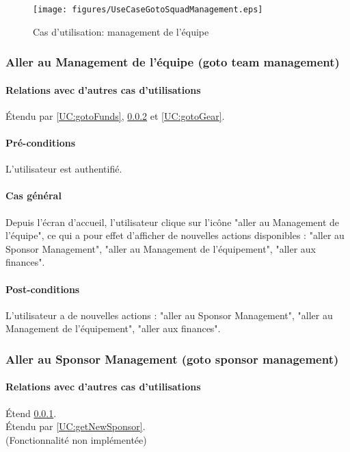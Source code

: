 \begin{figure}[h]
  \centering
  \texttt{[image: figures/UseCaseGotoSquadManagement.eps]}
   \caption{\label{fig:UC:gotoManagement} Cas d'utilisation: management de l'équipe}
\end{figure}

\subsubsection{Aller au Management de l'équipe (goto team management)}
\label{UC:gotoManagement}
\paragraph{Relations avec d'autres cas d'utilisations}
Étendu par \ref{UC:gotoFunds}, \ref{UC:gotoSponsor} et \ref{UC:gotoGear}.
\paragraph{Pré-conditions}
\begin{list}{}{\leftmargin=1.5em}
\item{L'utilisateur est authentifié.}
\end{list}
\paragraph{Cas général}
Depuis l'écran d'accueil, l'utilisateur clique sur l'icône "aller au Management de l'équipe", ce qui a pour effet d'afficher de nouvelles actions disponibles : "aller au Sponsor Management", "aller au Management de l'équipement", "aller aux finances".
\paragraph{Post-conditions}
\begin{list}{}{\leftmargin=1.5em}
\item{L'utilisateur a de nouvelles actions : "aller au Sponsor Management", "aller au Management de l'équipement", "aller aux finances".}
\end{list}

\subsubsection{Aller au Sponsor Management (goto sponsor management)}
\label{UC:gotoSponsor}
\paragraph{Relations avec d'autres cas d'utilisations}
Étend \ref{UC:gotoManagement}.\\
Étendu par \ref{UC:getNewSponsor}.
\\(Fonctionnalité non implémentée)
